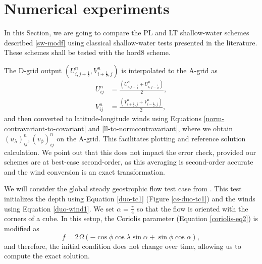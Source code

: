 \section{Numerical experiments}
\label{sec:numerical_results}
In this Section, we are going to compare the PL and LT shallow-water schemes described \eqref{sw-modf} using classical
shallow-water tests presented in the literature.
These schemes shall be tested with the hord8 scheme.

The D-grid output $(U_{i,j+\frac{1}{2}}^n,V_{i+\frac{1}{2},j}^n)$ is interpolated to the A-grid as
\begin{align}
U_{ij}^n &= \frac{(U_{i,j+\frac{1}{2}}^n+U_{i,j-\frac{1}{2}}^n)}{2},\\
V_{ij}^n &= \frac{(V_{i+\frac{1}{2},j}^n+V_{i-\frac{1}{2},j}^n)}{2},
\end{align}
and then converted to latitude-longitude winds using Equations \eqref{norm-contravariant-to-covariant} and \eqref{ll-to-normcontravariant},
where we obtain $(u_{\lambda})_{ij}^n,(v_{\phi})_{ij}^n$ on the A-grid.
This facilitates plotting and reference solution calculation. 
We point out that this does not impact the error check, 
provided our schemes are at best-case second-order, 
as this averaging is second-order accurate and the wind conversion is an exact transformation.


We will consider the global steady geostrophic flow test case from \citet{will:1992}.
This test initializes the depth using Equation \eqref{duo-tc1} (Figure \ref{cs-duo-tc1}) and the winds using Equation \eqref{duo-wind1}.
We set $\alpha=\frac{\pi}{4}$ so that the flow is oriented with the corners of a cube.
In this setup, the Coriolis parameter (Equation \eqref{coriolis-eq2}) is modified as
\begin{equation}
	\label{coriolis-eq2}
	f = 2 \Omega(-\cos{\phi}\cos{\lambda}\sin{\alpha} + \sin{\phi}\cos{\alpha}),
\end{equation}
and therefore, the initial condition does not change over time, allowing us to compute the exact solution.

